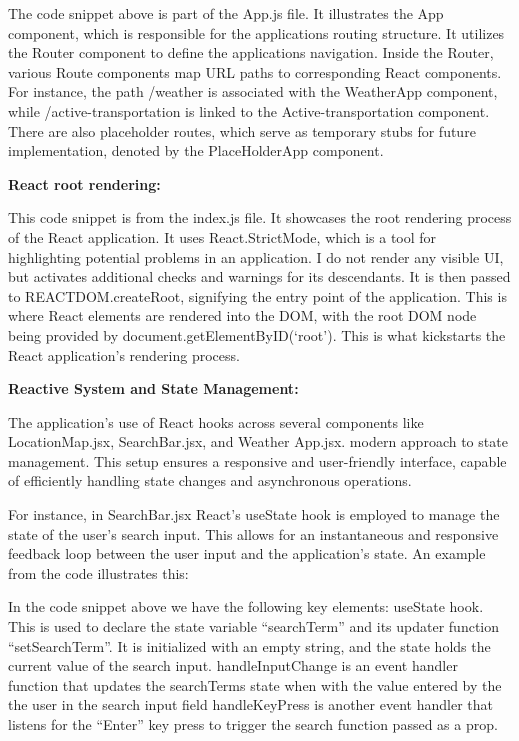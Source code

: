 The code snippet above is part of the App.js file. It illustrates the App component, which is responsible for the applications routing structure. It utilizes the Router component to define the applications navigation. Inside the Router, various Route components map URL paths to corresponding React components. For instance, the path /weather is associated with the WeatherApp component, while /active-transportation is linked to the Active-transportation component. There are also placeholder routes, which serve as temporary stubs for future implementation, denoted by the PlaceHolderApp component.

\textbf{React root rendering:} 



This code snippet is from the index.js file. It showcases the root rendering process of the React application. It uses React.StrictMode, which is a tool for highlighting potential problems in an application. I do not render any visible UI, but activates additional checks and warnings for its descendants. It is then passed to REACTDOM.createRoot, signifying the entry point of the application. This is where React elements are rendered into the DOM, with the root DOM node being provided by document.getElementByID(‘root’). This is what kickstarts the React application’s rendering process. 


\textbf{Reactive System and State Management:}

The application's use of React hooks across several components like LocationMap.jsx, SearchBar.jsx, and Weather App.jsx. modern approach to state management. This setup ensures a responsive and user-friendly interface, capable of efficiently handling state changes and asynchronous operations.

For instance, in SearchBar.jsx React's useState  hook is employed to manage the state of the user's search input. This allows for an instantaneous and responsive feedback loop between the user input and the application's state. An example from the code illustrates this:




In the code snippet above we have the following key elements: 
useState hook. This is used to declare the state variable “searchTerm” and its updater function “setSearchTerm”. It is initialized with an empty string, and the state holds the current value of the search input. 
handleInputChange is an event handler function that updates the searchTerms state when with the value entered by the the user in the search input field
handleKeyPress is another event handler that listens for the “Enter” key press to trigger the search function passed as a prop. 

